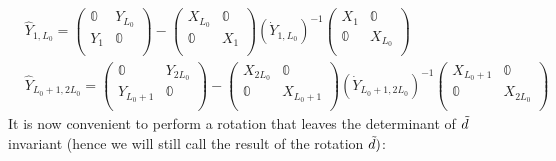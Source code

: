 \begin{equation}
    \begin{split}
        & \hat{Y}_{1, L_0} = \begin{pmatrix}
            \mathbb{0} & Y_{L_0} \\
            Y_1 & \mathbb{0} \\
        \end{pmatrix} - \begin{pmatrix}
            X_{L_0} & \mathbb{0} \\ 
            \mathbb{0} & X_{1} \\
        \end{pmatrix} (\Dot{Y}_{1, L_0})^{-1} \begin{pmatrix}
            X_1 & \mathbb{0} \\
            \mathbb{0} & X_{L_0} \\
        \end{pmatrix} \\
        & \hat{Y}_{L_0 + 1, 2L_0} = \begin{pmatrix}
            \mathbb{0} & Y_{2L_0} \\
            Y_{L_0 + 1} & \mathbb{0} \\
        \end{pmatrix} - \begin{pmatrix}
            X_{2L_0} & \mathbb{0} \\ 
            \mathbb{0} & X_{L_0 + 1} \\
        \end{pmatrix} (\Dot{Y}_{L_0 + 1, 2L_0})^{-1} \begin{pmatrix}
            X_{L_0 + 1} & \mathbb{0} \\
            \mathbb{0} & X_{2L_0} \\
        \end{pmatrix}
    \end{split}
\end{equation}
It is now convenient to perform a rotation that leaves the determinant of $\Tilde{d}$ invariant (hence we will still call the result of the rotation $\Tilde{d})$:
